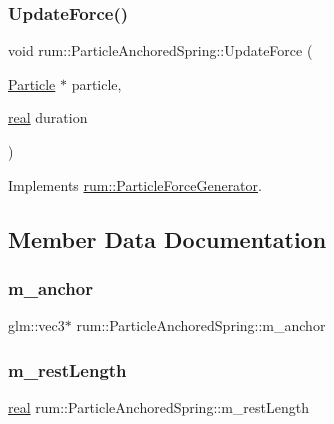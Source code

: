 \subsubsection{\texorpdfstring{Update\+Force()}{UpdateForce()}}
{\footnotesize\ttfamily void rum\+::\+Particle\+Anchored\+Spring\+::\+Update\+Force (\begin{DoxyParamCaption}\item[{\hyperlink{classrum_1_1_particle}{Particle} $\ast$}]{particle,  }\item[{\hyperlink{namespacerum_a7e8cca23573d5eaead0f138cbaa4862c}{real}}]{duration }\end{DoxyParamCaption})\hspace{0.3cm}{\ttfamily [virtual]}}



Implements \hyperlink{classrum_1_1_particle_force_generator_aca758295718deb8569796185ccbe8d54}{rum\+::\+Particle\+Force\+Generator}.



\subsection{Member Data Documentation}
\mbox{\label{classrum_1_1_particle_anchored_spring_a33813234e4924860ce0f5ee29efd5c96}} 
\subsubsection{\texorpdfstring{m\+\_\+anchor}{m\_anchor}}
{\footnotesize\ttfamily glm\+::vec3$\ast$ rum\+::\+Particle\+Anchored\+Spring\+::m\+\_\+anchor\hspace{0.3cm}{\ttfamily [protected]}}

\mbox{\label{classrum_1_1_particle_anchored_spring_ae0b4ab273dfd453b9e871ec1371d8ab8}} 
\subsubsection{\texorpdfstring{m\+\_\+rest\+Length}{m\_restLength}}
{\footnotesize\ttfamily \hyperlink{namespacerum_a7e8cca23573d5eaead0f138cbaa4862c}{real} rum\+::\+Particle\+Anchored\+Spring\+::m\+\_\+rest\+Length\hspace{0.3cm}{\ttfamily [protected]}}

